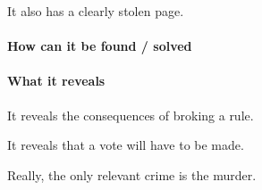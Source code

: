 {It also has a clearly stolen page.

\paragraph{How can it be found / solved}


\paragraph{What it reveals}

It reveals the consequences of broking a rule.

It reveals that a vote will have to be made.

Really, the only relevant crime is the murder.


}
